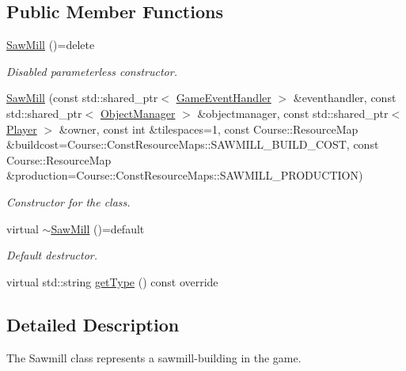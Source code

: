 \subsection*{Public Member Functions}
\begin{DoxyCompactItemize}
\item 
\hypertarget{classSawMill_a85fecb25b92b31d0d09cbb37cb485804}{\hyperlink{classSawMill_a85fecb25b92b31d0d09cbb37cb485804}{Saw\-Mill} ()=delete}\label{classSawMill_a85fecb25b92b31d0d09cbb37cb485804}

\begin{DoxyCompactList}\small\item\em Disabled parameterless constructor. \end{DoxyCompactList}\item 
\hyperlink{classSawMill_af7f5d19bfcee2e51865ee106b7d0999d}{Saw\-Mill} (const std\-::shared\-\_\-ptr$<$ \hyperlink{classGameEventHandler}{Game\-Event\-Handler} $>$ \&eventhandler, const std\-::shared\-\_\-ptr$<$ \hyperlink{classObjectManager}{Object\-Manager} $>$ \&objectmanager, const std\-::shared\-\_\-ptr$<$ \hyperlink{classPlayer}{Player} $>$ \&owner, const int \&tilespaces=1, const Course\-::\-Resource\-Map \&buildcost=Course\-::\-Const\-Resource\-Maps\-::\-S\-A\-W\-M\-I\-L\-L\-\_\-\-B\-U\-I\-L\-D\-\_\-\-C\-O\-S\-T, const Course\-::\-Resource\-Map \&production=Course\-::\-Const\-Resource\-Maps\-::\-S\-A\-W\-M\-I\-L\-L\-\_\-\-P\-R\-O\-D\-U\-C\-T\-I\-O\-N)
\begin{DoxyCompactList}\small\item\em Constructor for the class. \end{DoxyCompactList}\item 
\hypertarget{classSawMill_ac91d26a1ed2c5a685c0f8583be0c6ec2}{virtual \hyperlink{classSawMill_ac91d26a1ed2c5a685c0f8583be0c6ec2}{$\sim$\-Saw\-Mill} ()=default}\label{classSawMill_ac91d26a1ed2c5a685c0f8583be0c6ec2}

\begin{DoxyCompactList}\small\item\em Default destructor. \end{DoxyCompactList}\item 
virtual std\-::string \hyperlink{classSawMill_af15ad5811c446ee6f0cb540f4aa7e7d6}{get\-Type} () const override
\end{DoxyCompactItemize}


\subsection{Detailed Description}
The Sawmill class represents a sawmill-\/building in the game. 

